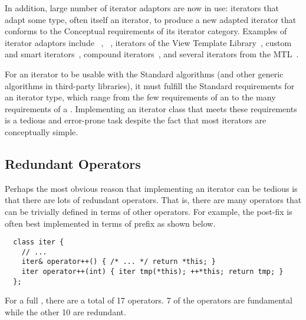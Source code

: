 \documentclass{netobjectdays}
\begin{document}

In addition, large number of iterator adaptors are now in use:
iterators that adapt some  type, often itself an iterator,
to produce a new adapted iterator that conforms to the Conceptual
requirements of its iterator category.
%
%
Examples of iterator adaptors include
~\cite{iso98:_cpp_final_draft_standard},
~\cite{stroustrup00:_cpp_prog_lang}, iterators of
the View Template Library~\cite{TMPW00:Weiser}, custom and smart
iterators~\cite{becker98:_smart_iteraters,TMPW00:Baus}, compound
iterators~\cite{alexandrescu98:_compound_iters}, and several iterators
from the MTL~\cite{siek99:_scitools}.

For an iterator to be usable with the Standard algorithms (and other
generic algorithms in third-party libraries), it must fulfill the
Standard requirements for an iterator type, which range from the few
requirements of an  to the many requirements
of a . Implementing an iterator class
that meets these requirements is a tedious and error-prone task
despite the fact that most iterators are conceptually simple.

\subsection{Redundant Operators}

Perhaps the most obvious reason that implementing an iterator can
be tedious is that there are lots of redundant operators.  That is,
there are many operators that can be trivially defined in terms of
other operators. For example, the post-fix  is often best
implemented in terms of prefix  as shown below.

{\footnotesize
\begin{verbatim}
  class iter {
    // ...
    iter& operator++() { /* ... */ return *this; }
    iter operator++(int) { iter tmp(*this); ++*this; return tmp; }
  };
\end{verbatim}
}

For a full , there are a total of 17
operators. 7 of the operators are fundamental while the other 10 are
redundant.
\end{document}
